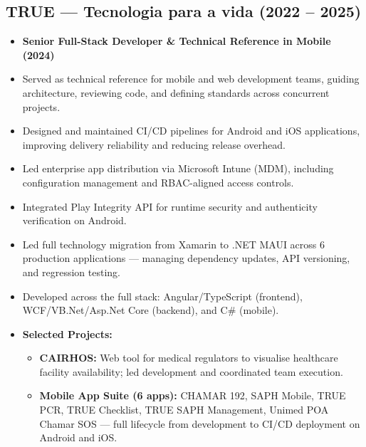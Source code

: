 \documentclass[a4paper,10pt]{article}
\begin{document}
\subsection*{TRUE --- Tecnologia para a vida (2022 -- 2025)}
\begin{itemize}[leftmargin=1cm]
    \item \textbf{Senior Full-Stack Developer \& Technical Reference in Mobile (2024)}
    \item Served as technical reference for mobile and web development teams, guiding architecture, reviewing code, and defining standards across concurrent projects.
    \item Designed and maintained CI/CD pipelines for Android and iOS applications, improving delivery reliability and reducing release overhead.
    \item Led enterprise app distribution via Microsoft Intune (MDM), including configuration management and RBAC-aligned access controls.
    \item Integrated Play Integrity API for runtime security and authenticity verification on Android.
    \item Led full technology migration from Xamarin to .NET MAUI across 6 production applications --- managing dependency updates, API versioning, and regression testing.
    \item Developed across the full stack: Angular/TypeScript (frontend), WCF/VB.Net/Asp.Net Core (backend), and C\# (mobile).
    \item \textbf{Selected Projects:}
    \begin{itemize}
        \item \textbf{CAIRHOS:} Web tool for medical regulators to visualise healthcare facility availability; led development and coordinated team execution.
        \item \textbf{Mobile App Suite (6 apps):} CHAMAR 192, SAPH Mobile, TRUE PCR, TRUE Checklist, TRUE SAPH Management, Unimed POA Chamar SOS --- full lifecycle from development to CI/CD deployment on Android and iOS.
    \end{itemize}
\end{itemize}
\end{document}
